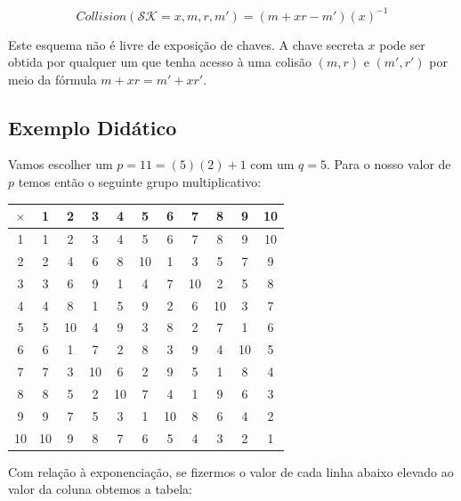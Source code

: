 \documentclass[a4paper]{article}
\begin{document}
 $$
 Collision(\mathcal{SK}=x, m, r, m') = (m+xr-m')(x)^{-1}
 $$
 
 Este esquema não é livre de exposição de chaves. A chave secreta $x$
 pode ser obtida por qualquer um que tenha acesso à uma colisão $(m,
 r)$ e $(m', r')$ por meio da fórmula $m+xr = m'+xr'$.
 
 
 
 
 
 
 \subsection{Exemplo Didático}
 
 Vamos escolher um $p=11=(5)(2)+1$ com um $q=5$. Para o nosso valor de
 $p$ temos então o seguinte grupo multiplicativo:
 
 \begin{tabular}{|c||c|c|c|c|c|c|c|c|c|c|}
 \hline
 $\times$&1&2&3&4&5&6&7&8&9&10\\
 \hline
 \hline
 1&1&2&3&4&5&6&7&8&9&10\\
 \hline
 2&2&4&6&8&10&1&3&5&7&9\\
 \hline
 3&3&6&9&1&4&7&10&2&5&8\\
 \hline
 4&4&8&1&5&9&2&6&10&3&7\\
 \hline
 5&5&10&4&9&3&8&2&7&1&6\\
 \hline
 6&6&1&7&2&8&3&9&4&10&5\\
 \hline
 7&7&3&10&6&2&9&5&1&8&4\\
 \hline
 8&8&5&2&10&7&4&1&9&6&3\\
 \hline
 9&9&7&5&3&1&10&8&6&4&2\\
 \hline
 10&10&9&8&7&6&5&4&3&2&1\\
 \hline
 \end{tabular}
 
 Com relação à exponenciação, se fizermos o valor de cada linha abaixo
 elevado ao valor da coluna obtemos a tabela:
 
\end{document}
